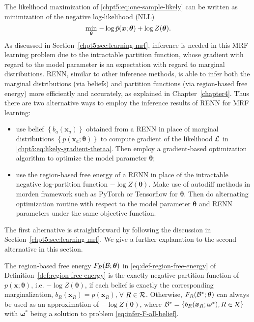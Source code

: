 The likelihood maximization of \eqref{chpt5:eq:one-sample-likely} can be written as minimization of the negative log-likelihood (NLL)
\begin{equation}\label{eq:maximizing-likelihood}
  \underset{\bm{\theta}}{\min}\;{ -\log{\tilde{p}(\bm{x}; \bm{\theta})} + \log{Z(\bm{\theta})}}.
\end{equation}
As discussed in Section~\ref{chpt5:sec:learning-mrf}, inference is needed in this MRF learning problem due to the intractable partition function, whose gradient with regard to the model parameter is an expectation with regard to marginal distributions. RENN, similar to other inference methods, is able to infer both the marginal distributions (via beliefs) and partition functions (via region-based free energy) more efficiently and accurately, as explained in Chapter~\ref{chapter4}. Thus there are two alternative ways to employ the inference results of RENN for MRF learning:
\begin{itemize}
\item use belief $\left\{ b_{a}(\bm{x}_a) \right\}$ obtained from a RENN in place of marginal distributions $\left\{ p(\bm{x}_a; \bm{\theta}) \right\}$ to compute gradient of the likelihood $\mathcal{L}$ in \eqref{chpt5:eq:likely-gradient-thetaa}. Then employ a gradient-based optimization algorithm to optimize the model parameter $\bm{\theta}$;
  \item use the region-based free energy of a RENN in place of the intractable negative log-partition function $-\log{Z(\bm{\theta})}$. Make use of autodiff methods in morden framework such as PyTorch or Tensorflow for $\bm{\theta}$. Then do alternating optimization routine with respect to the model parameter $\bm{\theta}$ and RENN parameters under the same objective function.
\end{itemize}
The first alternative is straightforward by following the discussion in Section~\ref{chpt5:sec:learning-mrf}. We give a further explanation to the second alternative in this section.

The region-based free energy $F_R(\mathcal{B};\bm{\theta})$ in \eqref{eq:def-region-free-energy} of Definition~\ref{def:region-free-energy} is the exactly negative partition function of $p(\bm{x};\bm{\theta})$, i.e. $-\log{Z(\bm{\theta})}$, if each belief is exactly the corresponding marginalization, $b_R(\bm{x}_R)=p(\bm{x}_{R})$, $\forall~R\in \mathcal{R}$. Otherwise, $F_R(\mathcal{B}^{\ast};\bm{\theta})$ can always be used as an approximation of $-\log{Z(\bm{\theta})}$, where $\mathcal{B}^{\ast}= \{b_R(\bm{x}_R; \bm{\omega}^{\ast}), R\in \mathcal{R}\}$ with $\bm{\omega}^{\ast}$ being a solution to problem \eqref{eq:infer-F-all-belief}.

